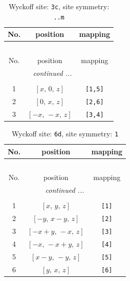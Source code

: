 \documentclass[fleqn,8pt]{jsarticle}
\begin{document}
\begin{longtable}{ccc}
\caption{Wyckoff site: {\tt 3c}, site symmetry: {\tt ..m}}
 \\
 \hline \hline
No. & position & mapping \\ \hline \endfirsthead

\multicolumn{2}{l}{\tablename\ \thetable{}} \\
 \hline \hline
No. & position & mapping \\ \hline \endhead

 \hline \hline
\multicolumn{2}{r}{\footnotesize\it continued ...} \\ \endfoot

 \hline \hline
\multicolumn{2}{r}{} \\ \endlastfoot

1 & $\left[ x,\, 0,\, z \right]$ & {\tt [1,5]} \\ \hline
2 & $\left[ 0,\, x,\, z \right]$ & {\tt [2,6]} \\ \hline
3 & $\left[ - x,\, - x,\, z \right]$ & {\tt [3,4]} \\
\end{longtable}
\renewcommand{\arraystretch}{1.2}
\begin{longtable}{ccc}
\caption{Wyckoff site: {\tt 6d}, site symmetry: {\tt 1}}
 \\
 \hline \hline
No. & position & mapping \\ \hline \endfirsthead

\multicolumn{2}{l}{\tablename\ \thetable{}} \\
 \hline \hline
No. & position & mapping \\ \hline \endhead

 \hline \hline
\multicolumn{2}{r}{\footnotesize\it continued ...} \\ \endfoot

 \hline \hline
\multicolumn{2}{r}{} \\ \endlastfoot

1 & $\left[ x,\, y,\, z \right]$ & {\tt [1]} \\ \hline
2 & $\left[ - y,\, x - y,\, z \right]$ & {\tt [2]} \\ \hline
3 & $\left[ - x + y,\, - x,\, z \right]$ & {\tt [3]} \\ \hline
4 & $\left[ - x,\, - x + y,\, z \right]$ & {\tt [4]} \\ \hline
5 & $\left[ x - y,\, - y,\, z \right]$ & {\tt [5]} \\ \hline
6 & $\left[ y,\, x,\, z \right]$ & {\tt [6]} \\
\end{longtable}
\end{document}
